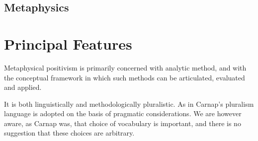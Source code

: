 \subsection{Metaphysics}



\section{Principal Features}

Metaphysical positivism is primarily concerned with analytic method,
and with the conceptual framework in which such methods can be
articulated, evaluated and applied.

It is both linguistically and methodologically pluralistic.
As in Carnap's pluralism language is adopted on the basis of pragmatic
considerations.
We are however aware, as Carnap was, that choice of vocabulary is
important, and there is no suggestion that these choices are
arbitrary.

 
